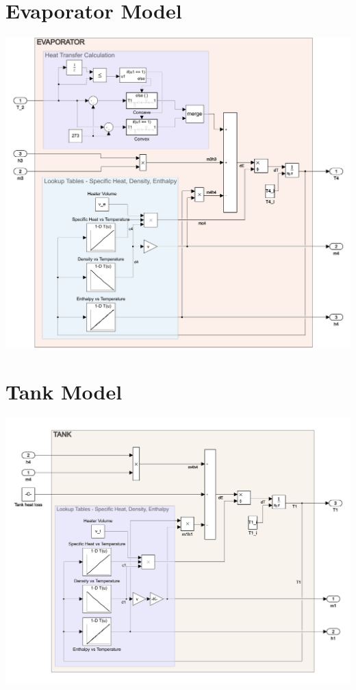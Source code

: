 \section{Evaporator Model}
\includegraphics[width=16cm]{images/evaporator-model.png}

\section{Tank Model}
\includegraphics[width=16cm]{images/tank-model.png}

